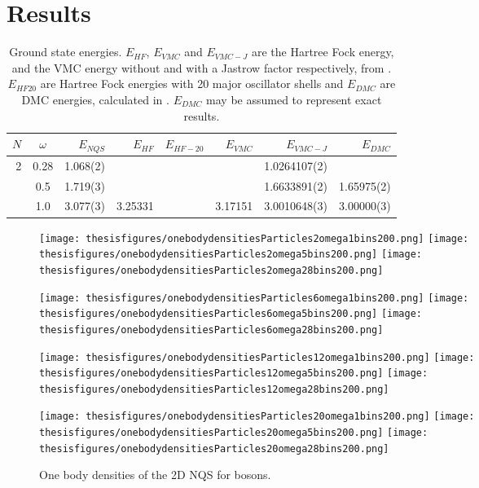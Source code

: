 \documentclass[twoside,english]{uiofysmaster}
\newcommand{\ra}[1]{\renewcommand{\arraystretch}{#1}}
\begin{document}
\section{Results}


\begin{table*}\centering
\ra{1.3}
\caption{Ground state energies. $E_{HF}$, $E_{VMC}$ and $E_{VMC-J}$ are the Hartree Fock energy, and  the VMC energy without and with a Jastrow factor respectively, from \cite{Mork2016}. $E_{HF20}$ are Hartree Fock energies with 20 major oscillator shells and $E_{DMC}$ are DMC energies, calculated in \cite{PedersenLohne2011}. $E_{DMC}$ may be assumed to represent exact results.} 
\label{tabsteptest1}
\begin{tabular}{rcrrrrrr}
\toprule
\toprule
$N$ & $\omega$ & $E_{NQS}$ & $E_{HF}$ & $E_{HF-20}$ & $E_{VMC}$ & $E_{VMC-J}$ & $E_{DMC}$ \\ 
\midrule 
2  & 0.28 & 1.068(2)  &         & &         & 1.0264107(2) &            \\
   & 0.5  & 1.719(3)  &         & &         & 1.6633891(2) & 1.65975(2) \\
   & 1.0  & 3.077(3)  & 3.25331 & & 3.17151 & 3.0010648(3) & 3.00000(3) \\
\bottomrule
\bottomrule
\end{tabular}
\end{table*}


\begin{figure}
\centering
 \texttt{[image: thesisfigures/onebodydensitiesParticles2omega1bins200.png]}
 \texttt{[image: thesisfigures/onebodydensitiesParticles2omega5bins200.png]}
 \texttt{[image: thesisfigures/onebodydensitiesParticles2omega28bins200.png]}

 \texttt{[image: thesisfigures/onebodydensitiesParticles6omega1bins200.png]}
 \texttt{[image: thesisfigures/onebodydensitiesParticles6omega5bins200.png]}
 \texttt{[image: thesisfigures/onebodydensitiesParticles6omega28bins200.png]}

 \texttt{[image: thesisfigures/onebodydensitiesParticles12omega1bins200.png]}
 \texttt{[image: thesisfigures/onebodydensitiesParticles12omega5bins200.png]}
 \texttt{[image: thesisfigures/onebodydensitiesParticles12omega28bins200.png]}

 \texttt{[image: thesisfigures/onebodydensitiesParticles20omega1bins200.png]}
 \texttt{[image: thesisfigures/onebodydensitiesParticles20omega5bins200.png]}
 \texttt{[image: thesisfigures/onebodydensitiesParticles20omega28bins200.png]}
 \caption{One body densities of the 2D NQS for bosons.}
 \label{fig:ValidationDifferentLR}
\end{figure}
\end{document}
